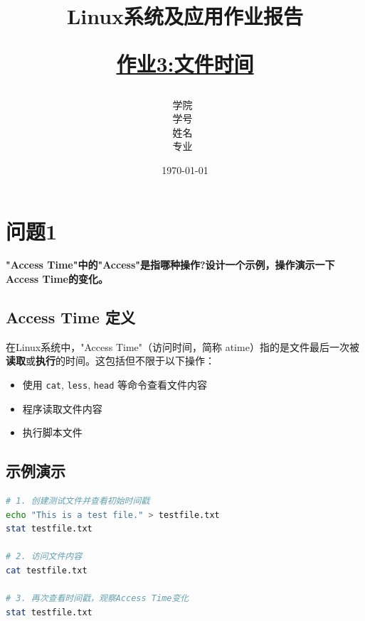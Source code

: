\documentclass[12pt,hyperref,a4paper,UTF8]{ctexart}
\title{ 
        \vspace{1cm}
        \heiti \Huge \textbf{Linux系统及应用作业报告} \par
        \vspace{1cm} 
        \heiti \Large {\underline{作业3:文件时间}   } 
        \vspace{3cm}
    
    }
\author{
        \vspace{0.5cm}
        \kaishu\Large 学院\ \dlmu[9cm]{卓越学院} \\ %
        \vspace{0.5cm}
        \kaishu\Large 学号\ \dlmu[9cm]{23040447} \\ %
        \vspace{0.5cm}
        \kaishu\Large 姓名\ \dlmu[9cm]{陈文轩} \qquad  \\ %
        \vspace{0.5cm}
        \kaishu\Large 专业\ \dlmu[9cm]{智能硬件与系统(电子信息工程)} \qquad \\ %
    }
\date{\today} %
\begin{document}
\cover
\thispagestyle{empty} %







\newpage
\setcounter{page}{1} %


\section{问题1}
\textbf{"Access Time"中的"Access"是指哪种操作?设计一个示例，操作演示一下Access Time的变化。}

\subsection{Access Time 定义}
在Linux系统中，"Access Time"（访问时间，简称 atime）指的是文件最后一次被\textbf{读取}或\textbf{执行}的时间。这包括但不限于以下操作：
\begin{itemize}
    \item 使用 \texttt{cat}, \texttt{less}, \texttt{head} 等命令查看文件内容
    \item 程序读取文件内容
    \item 执行脚本文件
\end{itemize}

\subsection{示例演示}
\begin{lstlisting}[language=bash, caption=演示Access Time变化]
# 1. 创建测试文件并查看初始时间戳
echo "This is a test file." > testfile.txt
stat testfile.txt

# 2. 访问文件内容
cat testfile.txt

# 3. 再次查看时间戳，观察Access Time变化
stat testfile.txt
\end{lstlisting}
\end{document}
